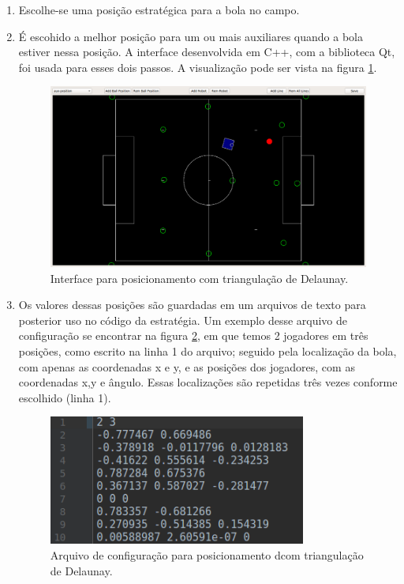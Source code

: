 \documentclass[a4paper,12pt]{article}
\begin{document}
\begin{enumerate}

\item Escolhe-se uma posição estratégica para a bola no campo.

\item É escohido a melhor posição para um ou mais auxiliares quando a bola estiver nessa posição. A interface desenvolvida em C++, com a biblioteca Qt\cite{Qt}, foi usada para esses dois passos. A visualização pode ser vista na figura \ref{fig:delaunay_interface}.

\begin{figure}[H]
	\centering
	\includegraphics[width=1.05\textwidth]{figures/delaunay_interface.png}
   \caption{Interface para posicionamento com triangulação de Delaunay.} \label{fig:delaunay_interface}
\end{figure}

\item Os valores dessas posições são guardadas em um arquivos de texto para posterior uso no código da estratégia. Um exemplo desse arquivo de configuração se encontrar na figura \ref{fig:text_config_delaunay}, em que temos 2 jogadores em três posições, como escrito na linha 1 do arquivo; seguido pela localização da bola, com apenas as coordenadas x e y, e as posições dos jogadores, com as coordenadas x,y e ângulo. Essas localizações são repetidas três vezes conforme escolhido (linha 1).

\begin{figure}[H]
	\centering
	\includegraphics[width=0.8\textwidth]{figures/text_config_delaunay.png}
   \caption{Arquivo de configuração para posicionamento dcom triangulação de Delaunay.} \label{fig:text_config_delaunay}
\end{figure}


\end{enumerate}
\end{document}
